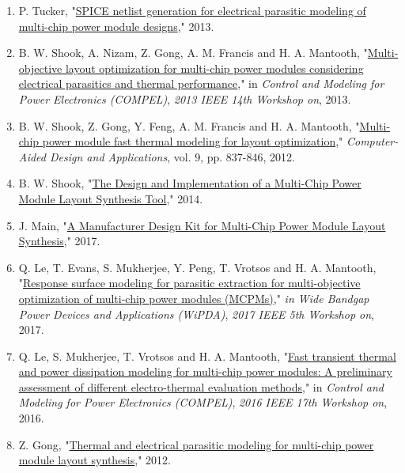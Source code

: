 \documentclass[11pt]{article}
\begin{document}
\begin{enumerate}
\item P. Tucker, "\href{./Publications/TUCKER-THESIS.pdf}{SPICE netlist generation for electrical parasitic modeling of multi-chip power module designs}," 2013.

\item B. W. Shook, A. Nizam, Z. Gong, A. M. Francis and H. A. Mantooth, "\href{./Publications/COMPEL paper.pdf}{Multi-objective layout optimization for multi-chip power modules considering electrical parasitics and thermal performance}," in \emph{Control and Modeling for Power Electronics (COMPEL)}, \emph{2013 IEEE 14th Workshop on}, 2013.

\item B. W. Shook, Z. Gong, Y. Feng, A. M. Francis and H. A. Mantooth, "\href{./Publications/CAD_9_6__837-846.pdf}{Multi-chip power module fast thermal modeling for layout optimization}," \emph{Computer-Aided Design and Applications}, vol. 9, pp. 837-846, 2012.

\item B. W. Shook, "\href{./Publications/Shook_Brett_thesis.pdf}{The Design and Implementation of a Multi-Chip Power Module Layout Synthesis Tool}," 2014.

\item J. Main, "\href{./Publications/Jonathan_Main_Thesis.pdf}{A Manufacturer Design Kit for Multi-Chip Power Module Layout Synthesis}," 2017.

\item Q. Le, T. Evans, S. Mukherjee, Y. Peng, T. Vrotsos and H. A. Mantooth, "\href{./Publications/WIPDA 2017.pdf}{Response surface modeling for parasitic extraction for multi-objective optimization of multi-chip power modules (MCPMs)}," \emph{in Wide Bandgap Power Devices and Applications (WiPDA)}, \emph{2017 IEEE 5th Workshop on}, 2017.

\item Q. Le, S. Mukherjee, T. Vrotsos and H. A. Mantooth, "\href{./Publications/COMPEL_2016_paper_140.pdf}{Fast transient thermal and power dissipation modeling for multi-chip power modules: A preliminary assessment of different electro-thermal evaluation methods}," in \emph{Control and Modeling for Power Electronics (COMPEL)}, \emph{2016 IEEE 17th Workshop on}, 2016.

\item Z. Gong, "\href{./Publications/Gong_Zihao_thesis.pdf}{Thermal and electrical parasitic modeling for multi-chip power module layout synthesis}," 2012.


\end{enumerate}
\end{document}
